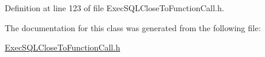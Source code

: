 Definition at line 123 of file Exec\+S\+Q\+L\+Close\+To\+Function\+Call.\+h.



The documentation for this class was generated from the following file\+:\begin{DoxyCompactItemize}
\item 
\hyperlink{_exec_s_q_l_close_to_function_call_8h}{Exec\+S\+Q\+L\+Close\+To\+Function\+Call.\+h}\end{DoxyCompactItemize}
